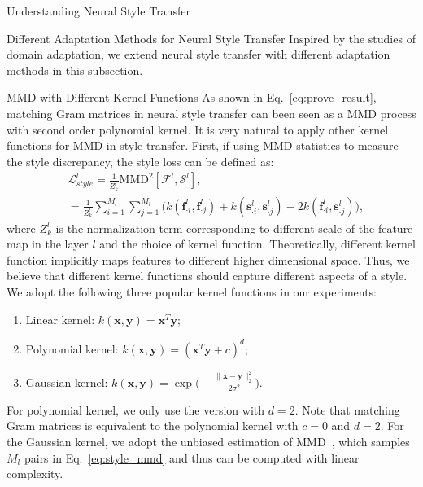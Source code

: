 \documentclass{article}
\newcommand{\col}[2]{#1_{\cdot #2}}
\begin{document}
\begin{section}{Understanding Neural Style Transfer}
\begin{subsection}{Different Adaptation Methods for Neural Style Transfer}
Inspired by the studies of domain adaptation, we extend neural style transfer with different adaptation methods in this subsection.

\begin{paragraph}{MMD with Different Kernel Functions}
As shown in Eq.~\ref{eq:prove_result}, matching Gram matrices in neural style transfer can been seen as a MMD process with second order polynomial kernel. It is very natural to apply other kernel functions for MMD in style transfer. First, if using MMD statistics to measure the style discrepancy, the style loss can be defined as:
\begin{equation}\label{eq:style_mmd}
\begin{aligned}
&\mathcal{L}_{style}^l = \frac{1}{Z^l_k}\text{MMD}^2[\mathcal{F}^{l}, \mathcal{S}^{l}],\\
	&= \frac{1}{Z^l_k}\sum_{i=1}^{M_l}\sum_{j=1}^{M_l}\Big( 
		k(\col{\mathbf{f}^l}{i}, \col{\mathbf{f}^l}{j}) +
		  k(\col{\mathbf{s}^l}{i}, \col{\mathbf{s}^l}{j}) - 2k(\col{\mathbf{f}^l}{i}, \col{\mathbf{s}^l}{j})
	\Big),
\end{aligned}
\end{equation}
where $Z^l_k$ is the normalization term corresponding to different scale of the feature map in the layer $l$ and the choice of  kernel function. Theoretically, different kernel function implicitly maps features to different higher dimensional space. Thus, we believe that different kernel functions should capture different aspects of a style. We adopt the following three popular kernel functions in our experiments:
\begin{enumerate}[{(1)}]
	\item Linear kernel: $k(\mathbf{x}, \mathbf{y}) = \mathbf{x}^T\mathbf{y}$;
	\item Polynomial kernel: $k(\mathbf{x}, \mathbf{y}) = (\mathbf{x}^T\mathbf{y} + c)^d$;
	\item Gaussian kernel: $k(\mathbf{x}, \mathbf{y}) = \exp\big( -\frac{\|\mathbf{x} - \mathbf{y}\|_2^2}{2\sigma^2}  \big)$.
\end{enumerate}
For polynomial kernel, we only use the version with $d = 2$. Note that matching Gram matrices is equivalent to the polynomial kernel with $c = 0$ and $d = 2$. For the Gaussian kernel, we adopt the unbiased estimation of MMD~\cite{gretton2012optimal}, which samples $M_l$ pairs in Eq.~\ref{eq:style_mmd} and thus can be computed with linear complexity. %



\end{paragraph}
\end{subsection}
\end{section}
\end{document}
